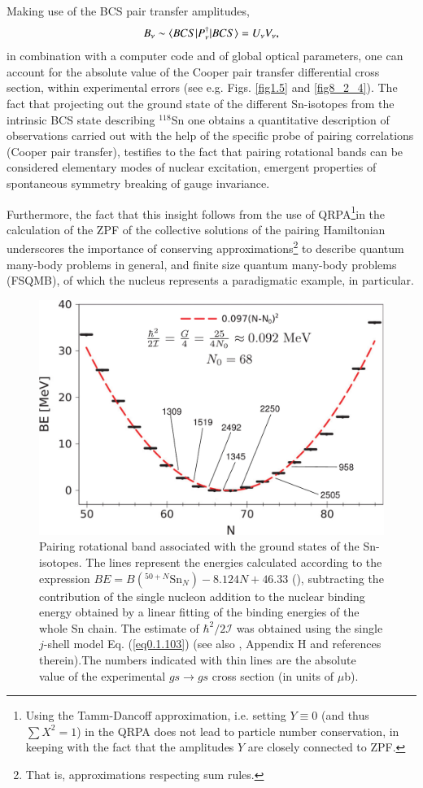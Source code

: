  Making use of the BCS pair transfer amplitudes,
\begin{align}\label{eq0.1.104}
B_\nu\sim\langle {BCS|P^\dagger_\nu|BCS} \rangle=U_\nu V_\nu,
\end{align}
in combination with a computer code and of global optical parameters, one can account for the  absolute value of the Cooper pair transfer differential cross section, within experimental errors (see e.g. Figs. \ref{fig1.5} and   \ref{fig8_2_4}). The fact that projecting out the ground state of the   different Sn-isotopes from the intrinsic BCS state describing $^{118}$Sn one obtains a quantitative description of observations carried out with the help of the specific probe of pairing correlations (Cooper pair transfer), testifies to the fact that pairing rotational bands can be considered elementary modes of nuclear excitation, emergent properties of spontaneous symmetry breaking of  gauge invariance. 

Furthermore, the fact that this insight follows from the use of QRPA\footnote{Using the Tamm-Dancoff approximation, i.e. setting $Y\equiv0$ (and thus $\sum X^2=1$) in the QRPA  does not lead to particle number conservation, in keeping with the fact that the amplitudes $Y$ are closely connected to ZPF.}in the calculation of the ZPF of the collective solutions of the pairing Hamiltonian underscores the importance of conserving approximations\footnote{That is, approximations respecting sum rules.} to describe quantum many-body problems in general, and  finite size quantum many-body problems (FSQMB), of which the nucleus represents a paradigmatic example, in particular. 
\begin{figure}
	\centerline {
		\includegraphics*[width=12cm, angle=0.]{introduccion/figs/fig0_4_5_v3}
	}
	\caption{Pairing rotational band associated with the ground states of the Sn-isotopes. The lines represent the energies calculated according to the expression $BE = B( ^{50+N}\text{Sn}_N ) - 8.124N + 46.33$ (\cite{Brink:05}), subtracting the contribution of the single nucleon addition to the nuclear binding		energy obtained by a linear fitting of the binding energies of the whole Sn chain. The estimate of $\hbar^2/2\mathcal I$ was obtained using the single $j$-shell model Eq. (\ref{eq0.1.103}) (see also  \cite{Brink:05}, Appendix H and references therein).The numbers indicated with thin lines  are the absolute value of the experimental $gs\to gs$ cross section (in units of $\mu $b).}
	\label{fig0.4.5}
\end{figure}
